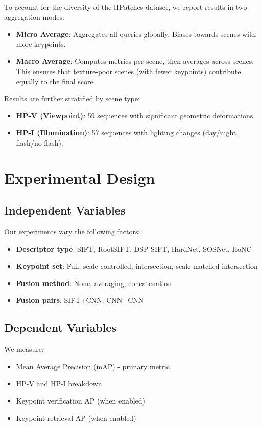 To account for the diversity of the HPatches dataset, we report results in two aggregation modes:
\begin{itemize}
    \item \textbf{Micro Average}: Aggregates all queries globally. Biases towards scenes with more keypoints.
    \item \textbf{Macro Average}: Computes metrics per scene, then averages across scenes. This ensures that texture-poor scenes (with fewer keypoints) contribute equally to the final score.
\end{itemize}

Results are further stratified by scene type:
\begin{itemize}
    \item \textbf{HP-V (Viewpoint)}: 59 sequences with significant geometric deformations.
    \item \textbf{HP-I (Illumination)}: 57 sequences with lighting changes (day/night, flash/no-flash).
\end{itemize}

\section{Experimental Design}

\subsection{Independent Variables}

Our experiments vary the following factors:

\begin{itemize}
    \item \textbf{Descriptor type}: SIFT, RootSIFT, DSP-SIFT, HardNet, SOSNet, HoNC
    \item \textbf{Keypoint set}: Full, scale-controlled, intersection, scale-matched intersection
    \item \textbf{Fusion method}: None, averaging, concatenation
    \item \textbf{Fusion pairs}: SIFT+CNN, CNN+CNN
\end{itemize}

\subsection{Dependent Variables}

We measure:
\begin{itemize}
    \item Mean Average Precision (mAP) - primary metric
    \item HP-V and HP-I breakdown
    \item Keypoint verification AP (when enabled)
    \item Keypoint retrieval AP (when enabled)
\end{itemize}


